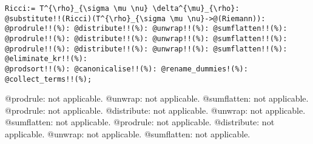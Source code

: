\documentclass[11pt]{article}
\begin{document}
{\color[named]{Blue}\begin{verbatim}
Ricci:= T^{\rho}_{\sigma \mu \nu} \delta^{\mu}_{\rho}:
@substitute!!(Ricci)(T^{\rho}_{\sigma \mu \nu}->@(Riemann)):
@prodrule!!(%): @distribute!!(%): @unwrap!!(%): @sumflatten!!(%):
@prodrule!!(%): @distribute!!(%): @unwrap!!(%): @sumflatten!!(%):
@prodrule!!(%): @distribute!!(%): @unwrap!!(%): @sumflatten!!(%):
@eliminate_kr!!(%):
@prodsort!!(%): @canonicalise!!(%): @rename_dummies!(%): @collect_terms!!(%);
\end{verbatim}}
@prodrule: not applicable.
@unwrap: not applicable.
@sumflatten: not applicable.
@prodrule: not applicable.
@distribute: not applicable.
@unwrap: not applicable.
@sumflatten: not applicable.
@prodrule: not applicable.
@distribute: not applicable.
@unwrap: not applicable.
@sumflatten: not applicable.
\end{document}
